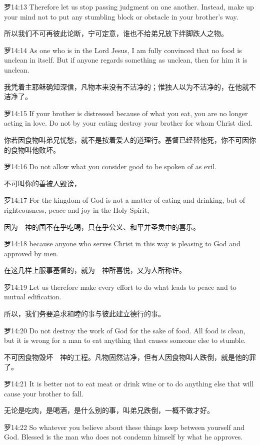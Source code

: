 \documentclass[a4paper,11pt,onecolumn,twoside]{ctexart}
\begin{document}
\begin{multicols}{2}
 罗14:13
 Therefore let us stop passing judgment on one another. Instead, make up your mind not to put any stumbling block or obstacle in your brother's way.

 所以我们不可再彼此论断，宁可定意，谁也不给弟兄放下绊脚跌人之物。


 罗14:14
 As one who is in the Lord Jesus, I am fully convinced that no food is unclean in itself. But if anyone regards something as unclean, then for him it is unclean.

 我凭着主耶稣确知深信，凡物本来没有不洁净的；惟独人以为不洁净的，在他就不洁净了。


 罗14:15
 If your brother is distressed because of what you eat, you are no longer acting in love. Do not by your eating destroy your brother for whom Christ died.

 你若因食物叫弟兄忧愁，就不是按着爱人的道理行。基督已经替他死，你不可因你的食物叫他败坏。


 罗14:16
 Do not allow what you consider good to be spoken of as evil.

 不可叫你的善被人毁谤，


 罗14:17
 For the kingdom of God is not a matter of eating and drinking, but of righteousness, peace and joy in the Holy Spirit,

 因为　神的国不在乎吃喝，只在乎公义、和平并圣灵中的喜乐。


 罗14:18
 because anyone who serves Christ in this way is pleasing to God and approved by men.

 在这几样上服事基督的，就为　神所喜悦，又为人所称许。


 罗14:19
 Let us therefore make every effort to do what leads to peace and to mutual edification.

 所以，我们务要追求和睦的事与彼此建立德行的事。


 罗14:20
 Do not destroy the work of God for the sake of food. All food is clean, but it is wrong for a man to eat anything that causes someone else to stumble.

 不可因食物毁坏　神的工程。凡物固然洁净，但有人因食物叫人跌倒，就是他的罪了。


 罗14:21
 It is better not to eat meat or drink wine or to do anything else that will cause your brother to fall.

 无论是吃肉，是喝酒，是什么别的事，叫弟兄跌倒，一概不做才好。


 罗14:22
 So whatever you believe about these things keep between yourself and God. Blessed is the man who does not condemn himself by what he approves.


\end{multicols}
\end{document}
